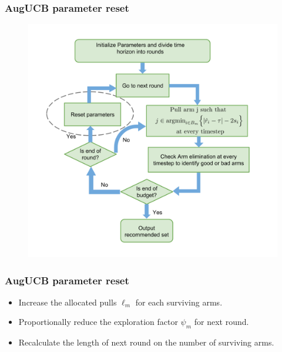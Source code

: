\begin{frame}
\frametitle{AugUCB parameter reset}
\begin{figure}
\includegraphics[scale=0.24]{img/AugUCB_flow_reset.png}
\end{figure}
\end{frame}


\begin{frame}
\frametitle{AugUCB parameter reset}
\begin{itemize}
\item<1-> Increase the allocated pulls $\ell_m$ for each surviving arms.
\item<2-> Proportionally reduce the exploration factor $\psi_m$ for next round.
\item<3-> Recalculate the length of next round on the number of surviving arms.
\end{itemize}
\end{frame}

